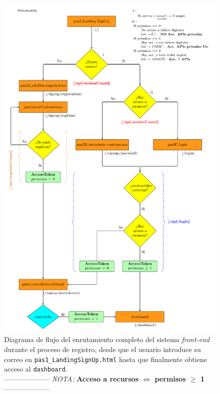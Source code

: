 \documentclass[a4paper,12pt]{report}
\begin{document}
	
	
	
	\setlength{\belowcaptionskip}{3pt}
	\FloatBarrier
	\begin{figure}[H]
		\centering
		\caption{Diagrama de flujo del enrutamiento completo del sistema \textit{front-end} durante el proceso de registro, desde que el usuario introduce su correo en \texttt{pas1\_LandingSignUp.html} hasta que finalmente obtiene acceso al \texttt{dashboard}.\\ -------------------- \textit{NOTA:} \textbf{Acceso a recursos $\iff$ permisos $\geq$ 1} --------------------}
		\includegraphics[width=1\textwidth]{img/diagramaMercAppFront.pdf}
		
		\label{fig:diagramaMercaAppFront} 
	\end{figure}
	\FloatBarrier
	
\end{document}
